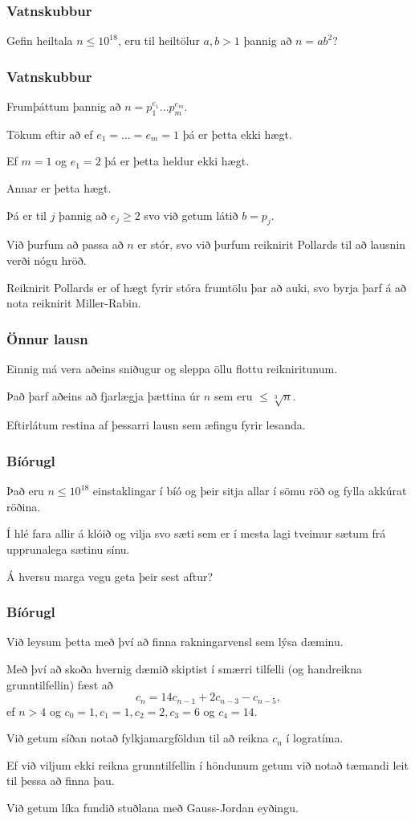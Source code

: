 {
	\frametitle{Vatnskubbur}
	{
		\item<1-> Gefin heiltala $n \leq 10^{18}$, eru til heiltölur $a, b > 1$ þannig að $n = ab^2$?
	}
}

{
	\frametitle{Vatnskubbur}
	{
		\item<1-> Frumþáttum þannig að $n = p_1^{e_1} \dots p_m^{e_m}$.
		\item<2-> Tökum eftir að ef $e_1 = \dots = e_m = 1$ þá er þetta ekki hægt.
		\item<3-> Ef $m = 1$ og $e_1 = 2$ þá er þetta heldur ekki hægt.
		\item<4-> Annar er þetta hægt.
		\item<5-> Þá er til $j$ þannig að $e_j \geq 2$ svo við getum látið $b = p_j$.
		\item<6-> Við þurfum að passa að $n$ er stór, svo við þurfum reiknirit Pollards til að lausnin verði nógu hröð.
        \item<7-> Reiknirit Pollards er of hægt fyrir stóra frumtölu þar að auki, svo byrja þarf á að nota reiknirit Miller-Rabin.
	}
}

{
    \frametitle{Önnur lausn}
    {
        \item<1-> Einnig má vera aðeins sniðugur og sleppa öllu flottu reikniritunum.
        \item<2-> Það þarf aðeins að fjarlægja þættina úr $n$ sem eru $\leq \sqrt[3]{n}$.
        \item<3-> Eftirlátum restina af þessarri lausn sem æfingu fyrir lesanda.
    }
}

{
	\frametitle{Bíórugl}
	{
		\item<1-> Það eru $n \leq 10^{18}$ einstaklingar í bíó og þeir sitja allar í sömu röð og fylla akkúrat röðina.
		\item<2-> Í hlé fara allir á klóið og vilja svo sæti sem er í mesta lagi tveimur sætum frá upprunalega sætinu sínu.
		\item<3-> Á hversu marga vegu geta þeir sest aftur?
	}
}

{
	\frametitle{Bíórugl}
	{
		\item<1-> Við leysum þetta með því að finna rakningarvensl sem lýsa dæminu.
		\item<2-> Með því að skoða hvernig dæmið skiptist í smærri tilfelli (og handreikna grunntilfellin) fæst að
		\[
			c_n = 14c_{n - 1} + 2c_{n - 3} - c_{n - 5},
		\]
		ef $n > 4$ og $c_0 = 1, c_1 = 1, c_2 = 2, c_3 = 6$ og $c_4 = 14$.
		\item<3-> Við getum síðan notað fylkjamargföldun til að reikna $c_n$ í logratíma.
		\item<4-> Ef við viljum ekki reikna grunntilfellin í höndunum getum við notað tæmandi leit til þessa að finna þau.
		\item<5-> Við getum líka fundið stuðlana með Gauss-Jordan eyðingu.
	}
}

